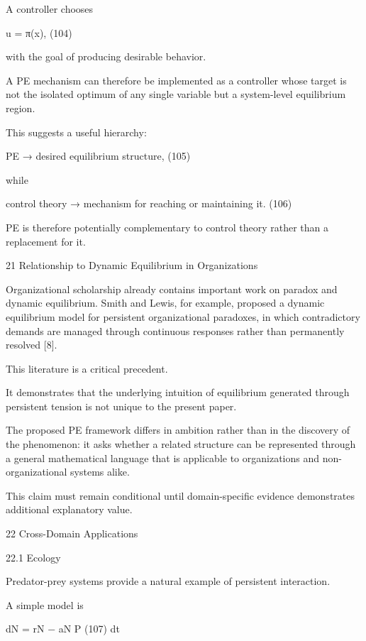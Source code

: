 \documentclass[10pt,a4paper]{article}
\begin{document}
\begin{ManuscriptText}
A controller chooses


                                            u = π(x),                                      (104)

with the goal of producing desirable behavior.

A PE mechanism can therefore be implemented as a controller whose target is not the isolated
optimum of any single variable but a system-level equilibrium region.

This suggests a useful hierarchy:


                               PE → desired equilibrium structure,                         (105)

while


                  control theory → mechanism for reaching or maintaining it.               (106)

PE is therefore potentially complementary to control theory rather than a replacement for it.


21      Relationship to Dynamic Equilibrium in Organizations

Organizational scholarship already contains important work on paradox and dynamic equilibrium.
Smith and Lewis, for example, proposed a dynamic equilibrium model for persistent organizational
paradoxes, in which contradictory demands are managed through continuous responses rather
than permanently resolved [8].

This literature is a critical precedent.

It demonstrates that the underlying intuition of equilibrium generated through persistent tension
is not unique to the present paper.

The proposed PE framework differs in ambition rather than in the discovery of the phenomenon:
it asks whether a related structure can be represented through a general mathematical language
that is applicable to organizations and non-organizational systems alike.

This claim must remain conditional until domain-specific evidence demonstrates additional
explanatory value.


22     Cross-Domain Applications

22.1      Ecology

Predator-prey systems provide a natural example of persistent interaction.

A simple model is

                                      dN
                                          = rN − aN P                                    (107)
                                       dt


\end{ManuscriptText}
\end{document}
